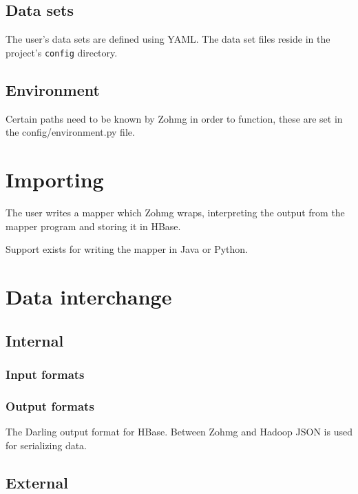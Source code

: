 \documentclass[a4paper,10pt]{book}
\begin{document}
\subsection{Data sets}


The user's data sets are defined using YAML. The data set files reside in
the project's \texttt{config} directory.


\subsection{Environment}

Certain paths need to be known by Zohmg in order to function, these are set
in the config/environment.py file.



\section{Importing}

The user writes a mapper which Zohmg wraps, interpreting the output from
the mapper program and storing it in HBase.

Support exists for writing the mapper in Java or Python.



\section{Data interchange}

\subsection{Internal}

\subsubsection{Input formats}

\subsubsection{Output formats}

The Darling output format for HBase. Between Zohmg and Hadoop JSON is used
for serializing data.


\subsection{External}
\end{document}
